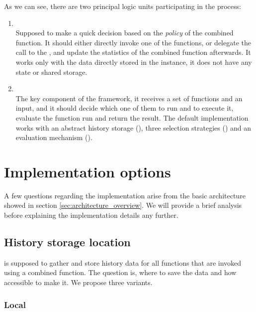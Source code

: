 As we can see, there are two principal logic units participating in the process:

\begin{enumerate}
	\item \textbf{} \\
	Supposed to make a quick decision based on the \textit{policy} of the combined function. It should either directly invoke one of the functions, or delegate the call to the , and update the statistics of the combined function afterwards. It works only with the data directly stored in the  instance, it does not have any state or shared storage.
	\item \textbf{} \\
	The key component of the framework, it receives a set of functions and an input, and it should decide which one of them to run and to execute it, evaluate the function run and return the result. The default implementation works with an abstract history storage (), three selection strategies () and an evaluation mechanism ().
\end{enumerate}

\section{Implementation options}

A few questions regarding the implementation arise from the basic architecture showed in section \ref{sec:architecture_overview}. We will provide a brief analysis before explaining the implementation details any further.

\subsection{History storage location}
\label{subsec:storing}

 is supposed to gather and store history data for all functions that are invoked using a combined function. The question is, where to save the data and how accessible to make it. We propose three variants.

\subsubsection{Local}

